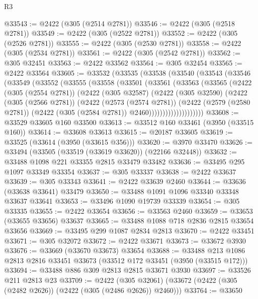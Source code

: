 \begin{lexlean}{R3}
\begin{coremodule}
@33543 := @2422 (@305 (@2514 @2781))
@33546 := @2422 (@305 (@2518 @2781))
@33549 := @2422 (@305 (@2522 @2781))
@33552 := @2422 (@305 (@2526 @2781))
@33555 := @2422 (@305 (@2530 @2781))
@33558 := @2422 (@305 (@2534 @2781))
@33561 := @2422 (@305 (@2542 @2781))
@33562 := @305 @32451
@33563 := @2422 @33562
@33564 := @305 @32454
@33565 := @2422 @33564
@33605 := @33532
    (@33535
      (@33538
        (@33540
          (@33543
            (@33546
              (@33549
                (@33552
                  (@33555
                    (@33558
                      (@33501
                        (@33561
                          (@33563
                            (@33565
                              (@2422
                                (@305 (@2554 @2781))
                                (@2422
                                  (@305 @32587)
                                  (@2422
                                    (@305 @32590)
                                    (@2422
                                      (@305 (@2566 @2781))
                                      (@2422
                                        (@2573 (@2574 @2781))
                                        (@2422
                                          (@2579 (@2580 @2781))
                                          (@2422 (@305 (@2584 @2781)) @2460))))))))))))))))))))
@33608 := @33529 @33605 @160 @33500
@33613 := @33512 @160 @33461 (@3950 (@33515 @160))
@33614 := @33608 @33613
@33615 := @20187 @33605
@33619 := @33525 (@33614 (@3950 (@33615 @356)))
@33620 := @3970 @33470
@33626 := @33494 (@33505 (@33519 (@33619 @33620)) (@22166 @32448))
@33632 := @33488 @1098 @221 @33355 @2815 @33479 @33482
@33636 := @33495 @295 @1097 @33349 @33354
@33637 := @305 @33337
@33638 := @2422 @33637
@33639 := @305 @33343
@33641 := @2422 @33639 @2460
@33644 := @33636 (@33638 @33641) @33479
@33650 := @33488 @1091 @1096 @33340 @33348 @33637 @33641
@33653 := @33496 @1090 @19739 @33339
@33654 := @305 @33335
@33655 := @2422 @33654
@33656 := @33563 @2460
@33659 := @33653 (@33655 @33656) @33637
@33665 := @33488 @1088 @718 @2836 @2815 @33654 @33656
@33669 := @33495 @299 @1087 @2834 @2813
@33670 := @2422 @33451
@33671 := @305 @32072
@33672 := @2422 @33671
@33673 := @33672 @3930
@33676 := @33669 (@33670 @33673) @33654
@33688 := @33488 @213 @1086 @2813 @2816 @33451 @33673 (@33512 @172 @33451 (@3950 (@33515 @172)))
@33694 := @33488 @886 @309 @2813 @2815 @33671 @3930
@33697 := @33526 @211 @2813 @23
@33709 := @2422
    (@305 @32061)
    (@33672 (@2422 (@305 (@2482 @2626)) (@2422 (@305 (@2486 @2626)) @2460)))
@33764 := @33650

\end{coremodule}
\end{lexlean}
